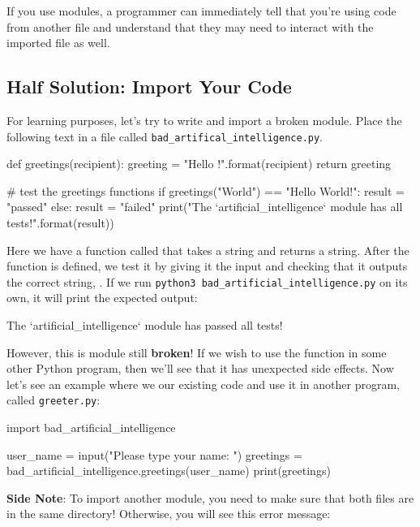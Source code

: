 \documentclass[11pt]{cselabheader}
\begin{document}
{If you use modules, a programmer can immediately tell that
you're using code from another file and understand that they may need
to interact with the imported file as well.

\subsection{Half Solution: Import Your Code}
For learning purposes, let's try to write and import a broken module. Place the
following text in a file called \texttt{bad\_artifical\_intelligence.py}.

\begin{python3code}
def greetings(recipient):
    greeting = "Hello {}!".format(recipient)
    return greeting

# test the greetings functions
if greetings("World") == "Hello World!":
    result = "passed"
else:
    result = "failed"
print("The `artificial_intelligence` module has {} all tests!".format(result))
\end{python3code}

Here we have a function called  that takes a string and
returns a string. After the function is defined, we test it by giving it the
input  and checking that it outputs the correct string,
. If we run \texttt{python3
  bad\_artificial\_intelligence.py} on its own, it will print the expected
output:

\begin{bashcode}
The `artificial_intelligence` module has passed all tests!
\end{bashcode}

However, this is module still \textbf{broken}! If we wish to use the function
 in some other Python program, then we'll see that it
has unexpected side effects. Now let's see an example where we
 our existing code and use it in another program, called
\texttt{greeter.py}:

\begin{python3code}
import bad_artificial_intelligence

user_name = input("Please type your name: ")
greetings = bad_artificial_intelligence.greetings(user_name)
print(greetings)
\end{python3code}

\textbf{Side Note}: To import another module, you need to make sure that both
files are in the same directory! Otherwise, you will see this error message:

}
\end{document}
